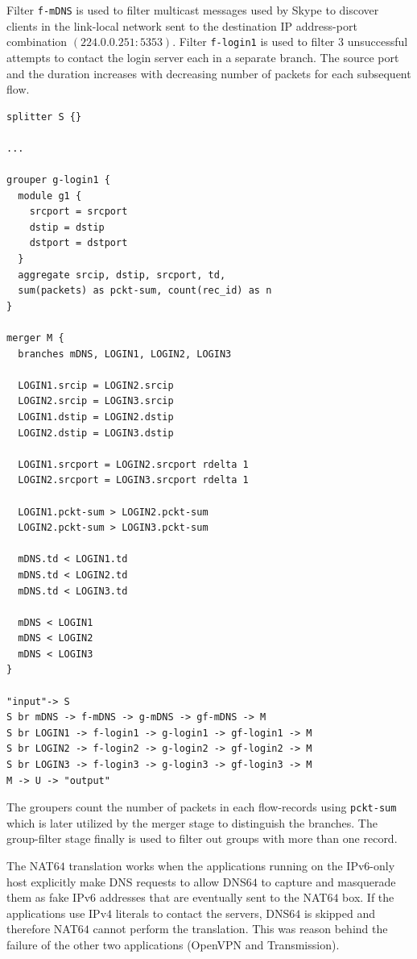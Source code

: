 Filter \texttt{f-mDNS} is used to filter multicast messages used by Skype to discover clients in the link-local network sent to the destination IP address-port combination $(224.0.0.251:5353)$. Filter \texttt{f-login1} is used to filter $3$ unsuccessful attempts to contact the login server each in a separate branch. The  source port and the duration increases with decreasing number of packets for each subsequent flow. 
\begin{lstlisting}
splitter S {}
	
...

grouper g-login1 {
  module g1 {
    srcport = srcport
    dstip = dstip
    dstport = dstport
  }     
  aggregate srcip, dstip, srcport, td,
  sum(packets) as pckt-sum, count(rec_id) as n
}

merger M {
  branches mDNS, LOGIN1, LOGIN2, LOGIN3
		      
  LOGIN1.srcip = LOGIN2.srcip
  LOGIN2.srcip = LOGIN3.srcip
  LOGIN1.dstip = LOGIN2.dstip
  LOGIN2.dstip = LOGIN3.dstip
	
  LOGIN1.srcport = LOGIN2.srcport rdelta 1
  LOGIN2.srcport = LOGIN3.srcport rdelta 1

  LOGIN1.pckt-sum > LOGIN2.pckt-sum
  LOGIN2.pckt-sum > LOGIN3.pckt-sum
	
  mDNS.td < LOGIN1.td
  mDNS.td < LOGIN2.td
  mDNS.td < LOGIN3.td
	
  mDNS < LOGIN1
  mDNS < LOGIN2
  mDNS < LOGIN3
}

"input"-> S
S br mDNS -> f-mDNS -> g-mDNS -> gf-mDNS -> M
S br LOGIN1 -> f-login1 -> g-login1 -> gf-login1 -> M
S br LOGIN2 -> f-login2 -> g-login2 -> gf-login2 -> M
S br LOGIN3 -> f-login3 -> g-login3 -> gf-login3 -> M
M -> U -> "output"

\end{lstlisting}
The groupers count the number of packets in each flow-records using \texttt{pckt-sum} which is later utilized by the merger stage to distinguish the branches. The group-filter stage finally is used to filter out groups with more than one record.

The NAT$64$ translation works when the applications running on the IPv$6$-only host explicitly make DNS requests to allow DNS$64$ to capture and masquerade them as fake IPv$6$ addresses that are eventually sent to the NAT$64$ box. If the applications use IPv$4$ literals to contact the servers, DNS$64$ is skipped and therefore NAT$64$ cannot perform the translation. This was reason behind the failure of the other two applications (OpenVPN and Transmission).

